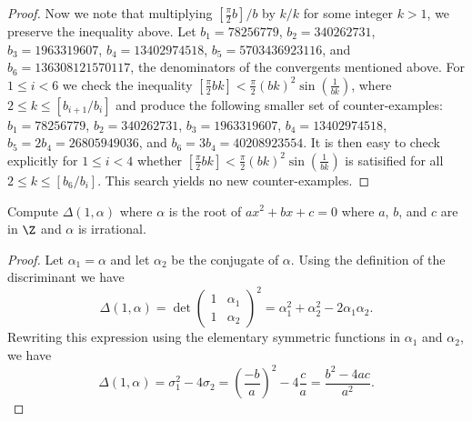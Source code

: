 \documentclass[10pt]{amsart}
\begin{document}
\begin{ex1}
\begin{proof}
    Now we note that multiplying $\left[\frac{\pi}{2}b\right]/b$ by $k/k$ for some integer $k > 1$, we preserve the inequality above.
    Let $b_1 = 78256779$, $b_2 = 340262731$, $b_3 = 1963319607$, $b_4 = 13402974518$, $b_5 = 5703436923116$, and $b_6 = 136308121570117$, the denominators of the convergents mentioned above.
    For $1 \leq i < 6$ we check the inequality $\left[\frac{\pi}{2}bk\right] < \frac{\pi}{2}(bk)^2\sin(\frac{1}{bk})$, where $2 \leq k \leq \left[b_{i+1}/b_{i}\right]$ and produce the following smaller set of counter-examples:
    $b_1 = 78256779$, $b_2 = 340262731$, $b_3 = 1963319607$, $b_4 = 13402974518$, $b_5 = 2b_4 = 26805949036$, and $b_6 = 3b_4 = 40208923554$.
    It is then easy to check explicitly for $1 \leq i < 4$ whether $\left[\frac{\pi}{2}bk\right] < \frac{\pi}{2}(bk)^2\sin(\frac{1}{bk})$ is satisified for all $2 \leq k \leq \left[b_{6}/b_{i}\right]$.
    This search yields no new counter-examples.
  \end{proof}
\end{ex1}

\begin{ex2}
  Compute $\Delta(1,\alpha)$ where $\alpha$ is the root of $ax^2 + bx + c = 0$ where $a$, $b$, and $c$ are in $\Z$ and $\alpha$ is irrational.
  \begin{proof}
    Let $\alpha_1 = \alpha$ and let $\alpha_2$ be the conjugate of $\alpha$.
    Using the definition of the discriminant we have $$\Delta(1,\alpha) = \det\left(\begin{array}{cc} 1 & \alpha_1\\1 & \alpha_2\end{array}\right)^2 = \alpha_1^2 + \alpha_2^2 - 2\alpha_1\alpha_2.$$
      Rewriting this expression using the elementary symmetric functions in $\alpha_1$ and $\alpha_2$, we have $$\Delta(1,\alpha) = \sigma_1^2 - 4\sigma_2 = \left(\frac{-b}{a}\right)^2 - 4\frac{c}{a} = \frac{b^2 - 4ac}{a^2}.$$
  \end{proof}
\end{ex2}
\end{document}

